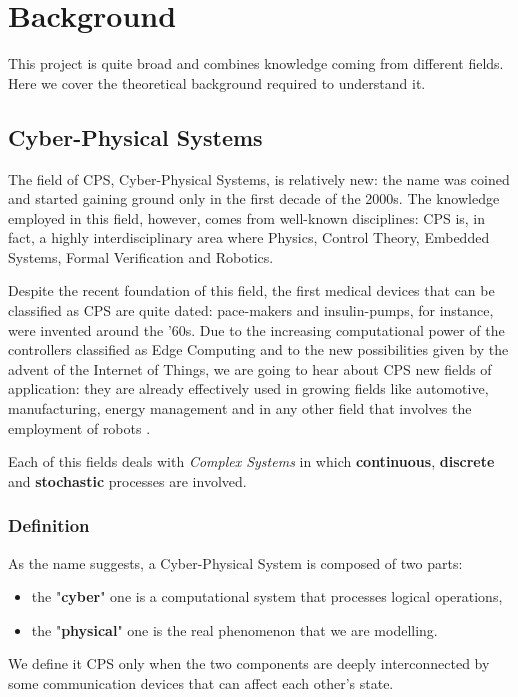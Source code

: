 \chapter{Background}

This project is quite broad and combines knowledge coming from different fields.
Here we cover the theoretical background required to understand it.

\section{Cyber-Physical Systems}

The field of CPS, Cyber-Physical Systems, is relatively new: the name was coined and started gaining ground only in the first decade of the 2000s.
The knowledge employed in this field, however, comes from well-known disciplines: CPS is, in fact, a highly interdisciplinary area where Physics, Control Theory, Embedded Systems, Formal Verification and Robotics.

Despite the recent foundation of this field, the first medical devices that can be classified as CPS are quite dated: pace-makers and insulin-pumps, for instance, were invented around the '60s.
Due to the increasing computational power of the controllers classified as Edge Computing \cite{edge_comp_2016} and to the new possibilities given by the advent of the Internet of Things, we are going to hear about CPS new fields of application: they are already effectively used in growing fields like automotive, manufacturing, energy management and in any other field that involves the employment of robots \cite{Sanislav_Miclea_2012}.

Each of this fields deals with \textit{Complex Systems} in which \textbf{continuous}, \textbf{discrete} and \textbf{stochastic} processes are involved.

\subsection{Definition}
As the name suggests, a Cyber-Physical System is composed of two parts:
\begin{itemize}
  \item the "\textbf{cyber}" one is a computational system that processes logical operations,
  \item the "\textbf{physical}" one is the real phenomenon that we are modelling.
\end{itemize}
We define it CPS only when the two components are deeply interconnected by some communication devices that can affect each other's state.

